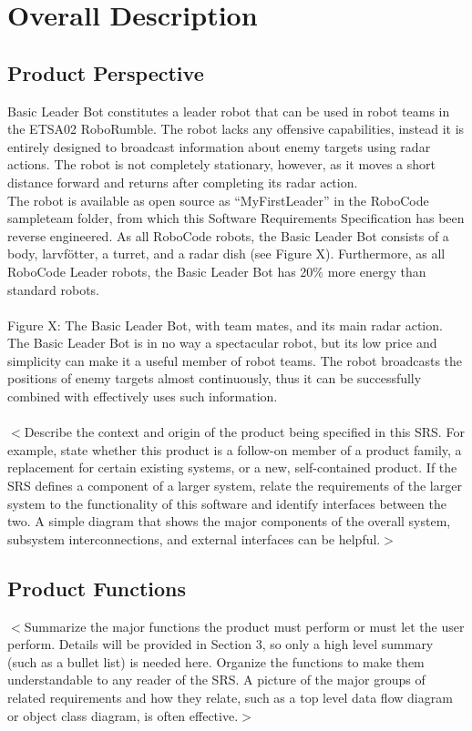 \documentclass{scrreprt}
\begin{document}
\chapter{Overall Description}

\section{Product Perspective}
Basic Leader Bot constitutes a leader robot that can be used in robot teams in the ETSA02 RoboRumble. The robot lacks any offensive capabilities, instead it is entirely designed to broadcast information about enemy targets using radar actions. The robot is not completely stationary, however, as it moves a short distance forward and returns after completing its radar action.\\

The robot is available as open source as ``MyFirstLeader'' in the RoboCode sampleteam folder, from which this Software Requirements Specification has been reverse engineered. As all RoboCode robots, the Basic Leader Bot consists of a body, larvfötter, a turret, and a radar dish (see Figure X). Furthermore, as all RoboCode Leader robots, the Basic Leader Bot has 20\% more energy than standard robots.\\\\

Figure X: The Basic Leader Bot, with team mates, and its main radar action.\\

The Basic Leader Bot is in no way a spectacular robot, but its low price and simplicity can make it a useful member of robot teams. The robot broadcasts the positions of enemy targets almost continuously, thus it can be successfully combined with effectively uses such information.\\\\
$<$Describe the context and origin of the product being specified in this SRS.  
For example, state whether this product is a follow-on member of a product 
family, a replacement for certain existing systems, or a new, self-contained 
product. If the SRS defines a component of a larger system, relate the 
requirements of the larger system to the functionality of this software and 
identify interfaces between the two. A simple diagram that shows the major 
components of the overall system, subsystem interconnections, and external 
interfaces can be helpful.$>$

\section{Product Functions}
$<$Summarize the major functions the product must perform or must let the user 
perform. Details will be provided in Section 3, so only a high level summary 
(such as a bullet list) is needed here. Organize the functions to make them 
understandable to any reader of the SRS. A picture of the major groups of 
related requirements and how they relate, such as a top level data flow diagram 
or object class diagram, is often effective.$>$
\end{document}
